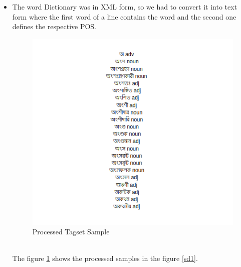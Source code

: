 \documentclass{standalone}
\begin{document}
\begin{itemize}
    \item The word Dictionary was in XML form, so we had to convert it into text form where the first word of a line contains the word and the second one defines the respective POS.\\
    \begin{figure}[h!]
    \centering
    \includegraphics[width=1.0\columnwidth]{img/dict.png}
    \caption{Processed Tagset Sample}
    \label{sd3}
    \end{figure}
    \\
    The figure \ref{sd3} shows the processed samples in the figure \ref{sd1}.
\end{itemize}
\end{document}
